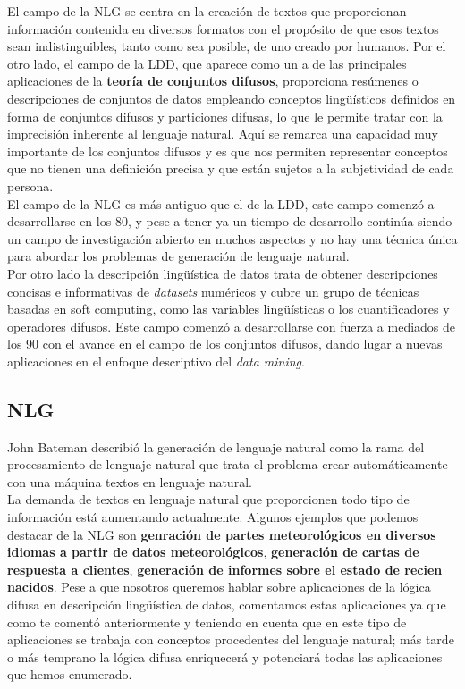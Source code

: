 \documentclass[10pt,a4paper]{article}
\begin{document}
El campo de la NLG se centra en la creación de textos que proporcionan información contenida en diversos formatos con el propósito de que esos textos sean indistinguibles, tanto como sea posible, de uno creado por humanos. Por el otro lado, el campo de la LDD, que aparece como un a de las principales aplicaciones de la \textbf{teoría de conjuntos difusos}, proporciona resúmenes o descripciones de conjuntos de datos empleando conceptos lingüísticos definidos en forma de conjuntos difusos y particiones difusas, lo que le permite tratar con la imprecisión inherente al lenguaje natural. Aquí se remarca una capacidad muy importante de los conjuntos difusos y es que nos permiten representar conceptos que no tienen una definición precisa y que están sujetos a la subjetividad de cada persona.\\

El campo de la NLG es más antiguo que el de la LDD, este campo comenzó a desarrollarse en los 80, y pese a tener ya un tiempo de desarrollo continúa siendo un campo de investigación abierto en muchos aspectos y no hay una técnica única para abordar los problemas de generación de lenguaje natural.\\

Por otro lado la descripción lingüística de datos trata de obtener descripciones concisas e informativas de \textit{datasets} numéricos y cubre un grupo de técnicas basadas en soft computing, como las variables lingüísticas o los cuantificadores y operadores difusos. Este campo comenzó a desarrollarse con fuerza a mediados de los 90 con el avance en el campo de los conjuntos difusos, dando lugar a nuevas aplicaciones en el enfoque descriptivo del \textit{data mining}.\\

\subsection{NLG}

John Bateman describió la generación de lenguaje natural como la rama del procesamiento de lenguaje natural que trata el problema crear automáticamente con una máquina textos en lenguaje natural.\\

La demanda de textos en lenguaje natural que proporcionen todo tipo de información está aumentando actualmente. Algunos ejemplos que podemos destacar de la NLG son \textbf{genración de partes meteorológicos en diversos idiomas a partir de datos meteorológicos}, \textbf{generación de cartas de respuesta a clientes}, \textbf{generación de informes sobre el estado de recien nacidos}. Pese a que nosotros queremos hablar sobre aplicaciones de la lógica difusa en descripción lingüística de datos, comentamos estas aplicaciones ya que como te comentó anteriormente y teniendo en cuenta que en este tipo de aplicaciones se trabaja con conceptos procedentes del lenguaje natural; más tarde o más temprano la lógica difusa enriquecerá y potenciará todas las aplicaciones que hemos enumerado.\\
\end{document}
